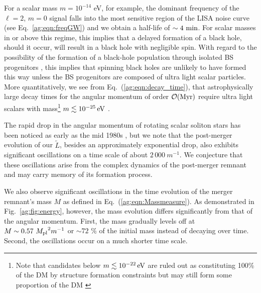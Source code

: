 %
For a scalar mass $m =  10^{-14}$ eV, for example,
the dominant frequency of the $\ell=2$, $m=0$ signal
falls into the most sensitive region of the LISA noise curve (see Eq.~\ref{ag:eqn:freqGW}) and we obtain a half-life of $\sim4~{\rm min}$. For scalar masses in or above this regime, this implies
that a delayed formation of a black hole, should it occur,
will result in a black hole with negligible spin. With regard to
the possibility of the formation of a black-hole population
through isolated BS progenitors
\cite{Helfer:2016ljl,Muia:2019coe}, this implies that
spinning black holes are unlikely to have formed this way unless
the BS progenitors are composed of ultra light scalar particles.
More quantitatively, we see from
Eq.~(\ref{ag:eqn:decay_time}), that
astrophysically large decay times for the angular momentum
of order
$\mathcal{O}({\rm Myr})$ require ultra light
scalars with mass\footnote{Note that candidates below $m\lesssim 10^{-22}\,{\rm eV}$ are ruled out as constituting 100\% of the DM by structure formation constraints but may still form some proportion of the DM \cite{Marsh:2015xka}}
$m\lesssim 10^{-25}\,{\rm eV}$ .



The rapid drop in the angular momentum of rotating
scalar soliton stars has been noticed as early as the mid 1980s
\cite{Lee:1986ts,Friedberg:1986tq},
but we note that the post-merger evolution of our $\tilde{L}$,
besides an approximately exponential drop, also exhibits
significant oscillations on a time scale of about
$2\,000~m^{-1}$. We conjecture that these oscillations
arise from the complex dynamics of the post-merger remnant
and may carry memory of its formation process.

We also observe significant oscillations in the time evolution
of the merger remnant's mass $M$ as defined in Eq.~(\ref{ag:eqn:Massmeasure}). As demonstrated in
Fig.~\ref{ag:fig:energy}, however, the mass evolution differs
significantly from that of the angular momentum.
First, the mass gradually levels off
at $M \sim 0.57~{M_{\rm pl}}^2 m^{-1}$ or $\sim 72$ \% of the initial mass instead of decaying over time.
Second, the oscillations occur on a much shorter time scale.

